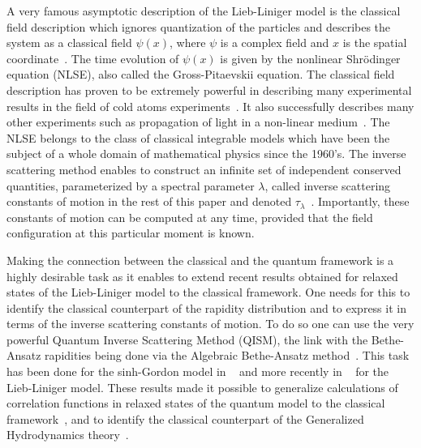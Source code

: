 \documentclass[submission,Phys,10pt]{SciPost}%
\newcommand{\comIsa}[1]{{\color{red}#1}}
\begin{document}
A very famous asymptotic description of the Lieb-Liniger
model is the classical field description
which ignores quantization of the particles 
and describes the system as a classical field $\psi(x)$, where $\psi$ is a complex field and
$x$ is the spatial coordinate~\cite{bouchoule_generalized_2022,castin_simple_2004,cockburn_comparison_2011,blakie_dynamics_2008}.
The time evolution of $\psi(x)$ is given by the nonlinear Shr\"odinger equation (NLSE), also called the
Gross-Pitaevskii equation. 
The classical field description has proven to be extremely powerful in describing
many experimental results in the field of cold atoms experiments~\cite{cockburn_comparison_2011}.
It also successfully describes many other experiments such as propagation
of light in \comIsa{a} non-linear medium~\cite{bienaime_quantitative_2021}.
The NLSE belongs to the class of classical integrable models
which have been the subject of a whole domain of mathematical physics since the 1960's. 
The inverse scattering method
enables to construct an infinite set of independent conserved quantities, parameterized
by a 
spectral parameter $\lambda$, called
inverse scattering constants of motion in the rest of this paper
and denoted $\tau_\lambda$~\cite{novikov_theory_1984}. Importantly, these constants of motion can be computed at any time, provided that the field configuration at this particular moment is known. 


Making the connection between the classical and the
quantum framework is a highly desirable task as it enables to
extend recent results obtained for relaxed states of the Lieb-Liniger model
to the classical framework.
One needs for this to
identify the classical counterpart of  the rapidity distribution and to express
it in terms of the inverse scattering constants of motion.
To do so one can use the very powerful
Quantum Inverse Scattering Method (QISM), the link with the
Bethe-Ansatz rapidities being done via 
the  Algebraic Bethe-Ansatz method~\cite{korepin_quantum_1993}.
This task  has been done  for
the sinh-Gordon model in ~\cite{luca_equilibration_2016}
and more recently in ~\cite{bettelheim_whitham_2020} for the Lieb-Liniger model.
These results made it possible 
to generalize calculations of  correlation functions
in relaxed states of the quantum model 
to the classical framework~\cite{luca_equilibration_2016,del_vecchio_del_vecchio_exact_2020}, and  
to identify the classical counterpart of  the
Generalized Hydrodynamics theory~\cite{bettelheim_whitham_2020}.
\end{document}
